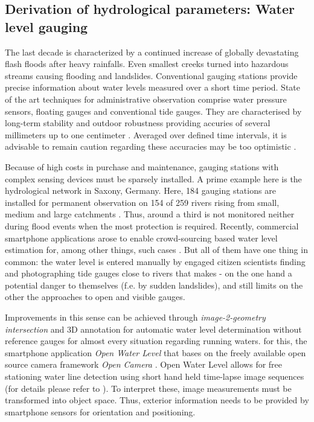 \documentclass[review]{elsarticle}
\begin{document}
\subsection{Derivation of hydrological parameters: Water level gauging}
\label{sec:water_level_gauging_intro}
The last decade is characterized by a continued increase of globally devastating flash floods after heavy rainfalls. Even smallest creeks turned into hazardous streams causing flooding and landslides. Conventional gauging stations provide precise information about water levels measured over a short time period. State of the art techniques for administrative observation comprise water pressure sensors, floating gauges and conventional tide gauges. They are characterised by long-term stability and outdoor robustness providing accuries of several millimeters up to one centimeter \cite{Siedschlag2015}. Averaged over defined time intervals, it is advisable to remain caution regarding these accuracies may be too optimistic \cite{Horner2018} . 
 
Because of high costs in purchase and maintenance, gauging stations with complex sensing devices must be sparsely installed. A prime example here is the hydrological network in Saxony, Germany. Here, 184 gauging stations are installed for permanent observation on 154 of 259 rivers rising from small, medium and large catchments \cite{Saxon2018, Buettner2015}. Thus, around a third is not monitored neither during flood events when the most protection is required. Recently, commercial smartphone applications arose to enable crowd-sourcing based water level estimation for, among other things, such cases \cite{CrowdWaterApp2017a, Kisters2014}. But all of them have one thing in common: the water level is entered manually by engaged citizen scientists finding and photographing tide gauges close to rivers that makes - on the one hand a potential danger to themselves (f.e. by sudden landslides), and still limits on the other the approaches to open and visible gauges.

Improvements in this sense can be achieved through \textit{image-2-geometry intersection} and 3D annotation for automatic water level determination without reference gauges for almost every situation regarding running waters. 
for this, the smartphone application \textit{Open Water Level} that bases on the freely available open source camera framework \textit{Open Camera} \cite{Harman2017}. Open Water Level allows for free stationing water line detection using short hand held time-lapse image sequences (for details please refer to \cite{Kroehnert2017}). To interpret these, image measurements must be transformed into object space. Thus, exterior information needs to be provided by smartphone sensors for orientation and positioning.
\end{document}
